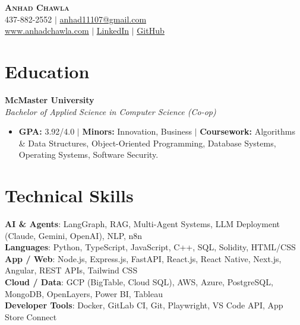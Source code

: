\documentclass[10pt]{article}
\begin{document}
\begin{center}
  {\LARGE\scshape\bfseries Anhad Chawla}\\[3pt]
  437-882-2552 $|$ \href{mailto:anhad11107@gmail.com}{anhad11107@gmail.com}\\[1pt]
  \href{https://www.anhadchawla.com}{\underline{www.anhadchawla.com}} $|$
  \href{https://linkedin.com/in/anhad-chawla}{\underline{LinkedIn}} $|$
  \href{https://github.com/AsmpSa00}{\underline{GitHub}}
\end{center}

\section{Education}
\textbf{McMaster University}\\
\textit{Bachelor of Applied Science in Computer Science (Co-op)}
\begin{itemize}
  \item \textbf{GPA:} 3.92/4.0 $|$ \textbf{Minors:} Innovation, Business $|$
        \textbf{Coursework:} Algorithms \& Data Structures,
        Object-Oriented Programming, Database Systems,
        Operating Systems, Software Security.
\end{itemize}

\section{Technical Skills}
\textbf{AI \& Agents}: LangGraph, RAG, Multi-Agent Systems, LLM Deployment (Claude, Gemini, OpenAI), NLP, n8n\\
\textbf{Languages}: Python, TypeScript, JavaScript, C++, SQL, Solidity, HTML/CSS\\
\textbf{App / Web}: Node.js, Express.js, FastAPI, React.js, React Native, Next.js, Angular, REST APIs, Tailwind CSS\\
\textbf{Cloud / Data}: GCP (BigTable, Cloud SQL), AWS, Azure, PostgreSQL, MongoDB, OpenLayers, Power BI, Tableau\\
\textbf{Developer Tools}: Docker, GitLab CI, Git, Playwright, VS Code API, App Store Connect
\end{document}
